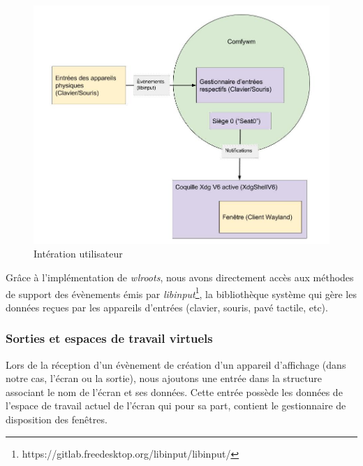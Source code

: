 \documentclass[titlepage]{article}
\begin{document}
\begin{figure}[H]
	\centering
	\includegraphics[width=\textwidth]{interaction_utilisateur.jpg}
	\caption{Intération utilisateur}
\end{figure}

\par
Grâce à l'implémentation de \textit{wlroots}, nous avons directement accès aux
méthodes de support des évènements émis par
\textit{libinput}\footnote{https://gitlab.freedesktop.org/libinput/libinput/},
la bibliothèque système qui gère les données reçues par les appareils d'entrées
(clavier, souris, pavé tactile, etc).
\bigskip

\subsubsection{Sorties et espaces de travail virtuels}
\par
Lors de la réception d'un évènement de création d'un appareil d'affichage (dans
notre cas, l'écran ou la sortie), nous ajoutons une entrée dans la structure
associant le nom de l'écran et ses données. Cette entrée possède les données de
l'espace de travail actuel de l'écran qui pour sa part, contient le gestionnaire
de disposition des fenêtres.
\bigskip
\end{document}
